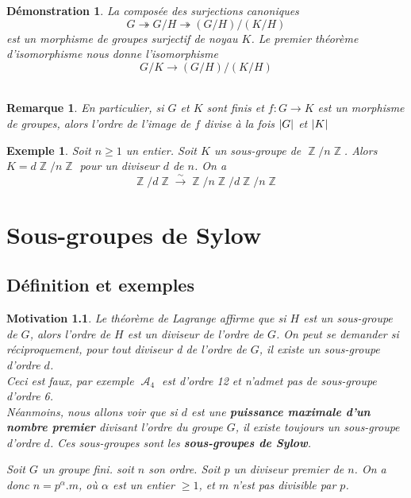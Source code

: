 \documentclass[a4paper, oneside]{report}
\theoremstyle{break}
\newtheorem{remar}[thm]{Remarque}
\newtheorem{exemple}[thm]{Exemple}
\newtheorem*{motivation}{Motivation}
\newtheorem*{demo}{Démonstration}
\newcommand{\mdg}{morphisme de groupes }
\newcommand{\isom}{isomorphisme }
\newcommand{\fong}{\overset{\sim}{\rightarrow}}
\newcommand{\surj}{\twoheadrightarrow}
\DeclareMathOperator{\Z}{\mathbb{Z}}
\DeclareMathOperator{\A}{\mathcal{A}}
\DeclarePairedDelimiter\abs{\lvert}{\rvert}%
\begin{document}
\begin{demo}
La composée des surjections canoniques 
$$G\surj G/H \surj (G/H)\big/(K/H)$$
est un \mdg surjectif de noyau $K$. Le premier théorème d'\isom nous donne l'\isom 
$$G/K \rightarrow (G/H)\big/(K/H)$$
~
\end{demo}

\begin{remar}
En particulier, si $G$ et $K$ sont finis et $f: G \to K$ est un morphisme
de groupes, alors l'ordre de l'image de $f$ divise à la fois $\abs{G}$ et $\abs{K}$ 
\end{remar}

\begin{exemple}
Soit $n \geq 1$ un entier. Soit $K$ un sous-groupe de $\Z/n\Z$. Alors $K = d \Z/n\Z$ pour un diviseur $d$ de $n$. On a
\[
\Z/d\Z \fong \Z/n\Z \big/ d\Z/n\Z
\]

\end{exemple}

\chapter{Sous-groupes de Sylow}

\section{Définition et exemples}

\begin{motivation}
Le théorème de Lagrange affirme que si $H$ est un sous-groupe de $G$, alors l'ordre de $H$ est un diviseur de l'ordre de $G$. On peut se demander si réciproquement, pour tout diviseur d de l'ordre de $G$, il existe un sous-groupe d'ordre $d$.\\
Ceci est faux, par exemple $\A_4$ est d'ordre 12 et n'admet pas de sous-groupe d'ordre 6.\\
Néanmoins, nous allons voir que si $d$ est une \textbf{puissance maximale d'un nombre premier} divisant l'ordre du groupe $G$, il existe toujours un sous-groupe d'ordre $d$. Ces sous-groupes sont les \textbf{sous-groupes de Sylow}.

\vspace{1em}
\medbreak

Soit $G$ un groupe fini. soit $n$ son ordre. Soit $p$ un diviseur premier de $n$. On a donc $n = p^\alpha . m$, où $\alpha$ est un entier $\geq 1$, et $m$ n'est pas divisible par $p$.
\end{motivation}
\end{document}
